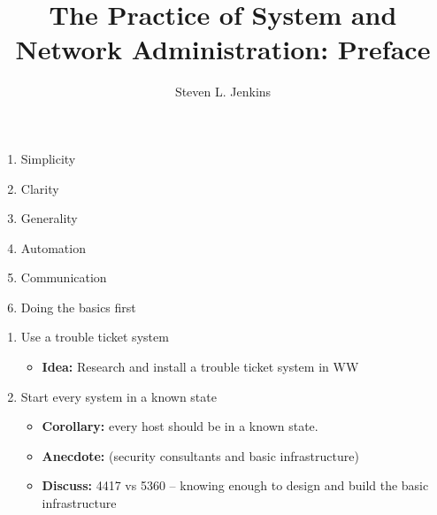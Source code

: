 \documentclass{slides}
\title{The Practice of System and Network Administration: Preface}
\author{Steven L. Jenkins}
\newcommand{\bi}{\begin{itemize}}
\newcommand{\ei}{\end{itemize}}
\newcommand{\be}{\begin{enumerate}}
\newcommand{\ee}{\end{enumerate}}
\newcommand{\assignment}[1]{{\bf Idea: } #1 }
\begin{document}
\maketitle


\be
\item Simplicity
\item Clarity
\item Generality
\item Automation
\item Communication
\item Doing the basics first
\ee


\be
\item Use a trouble ticket system
	\bi
	\item \assignment{Research and install a trouble ticket system in WW}
	\ei
\item Start every system in a known state
	\bi
	\item {\bf Corollary:} every host should be in a known state.
	\item {\bf Anecdote:} (security consultants and basic infrastructure)
	\item {\bf Discuss:} 4417 vs 5360 -- knowing enough to design
	and build the basic infrastructure
	\ei
\ee
\end{document}
